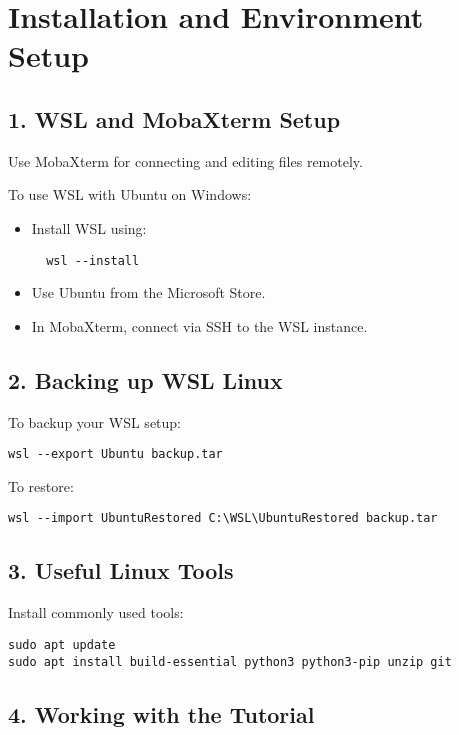 
\chapter*{Installation and Environment Setup}

\section*{1. WSL and MobaXterm Setup}

Use MobaXterm for connecting and editing files remotely.

To use WSL with Ubuntu on Windows:

\begin{itemize}
  \item Install WSL using:
  \begin{verbatim}
  wsl --install
  \end{verbatim}
  \item Use Ubuntu from the Microsoft Store.
  \item In MobaXterm, connect via SSH to the WSL instance.
\end{itemize}

\section*{2. Backing up WSL Linux}

To backup your WSL setup:

\begin{verbatim}
wsl --export Ubuntu backup.tar
\end{verbatim}

To restore:

\begin{verbatim}
wsl --import UbuntuRestored C:\WSL\UbuntuRestored backup.tar
\end{verbatim}

\section*{3. Useful Linux Tools}

Install commonly used tools:

\begin{verbatim}
sudo apt update
sudo apt install build-essential python3 python3-pip unzip git
\end{verbatim}

\section*{4. Working with the Tutorial}

